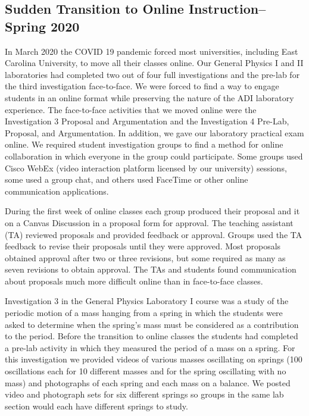 \documentclass[aip, numerical, preprint]{revtex4-2}
\begin{document}
\subsection{Sudden Transition to Online Instruction--Spring 2020}

In March 2020 the COVID 19 pandemic forced most universities, including East Carolina University, to move all their classes online. Our General Physics I and II laboratories had completed two out of four full investigations and the pre-lab for the third investigation face-to-face. We were forced to find a way to engage students in an online format while preserving the nature of the ADI laboratory experience. The face-to-face activities that we moved online were the Investigation 3 Proposal and Argumentation and the Investigation 4 Pre-Lab, Proposal, and Argumentation. In addition, we gave our laboratory practical exam online. We required student investigation groups to find a method for online collaboration in which everyone in the group could participate. Some groups used Cisco WebEx (video interaction platform licensed by our university) sessions, some used a group chat, and others used FaceTime or other online communication applications. 

During the first week of online classes each group produced their proposal and it on a Canvas Discussion in a proposal form for approval. The teaching assistant (TA) reviewed proposals and provided feedback or approval. Groups used the TA feedback to revise their proposals until they were approved. Most proposals obtained approval after two or three revisions, but some required as many as seven revisions to obtain approval. The TAs and students found communication about proposals much more difficult online than in face-to-face classes. 

Investigation 3 in the General Physics Laboratory I course was a study of the periodic motion of a mass hanging from a spring in which the students were asked to determine when the spring's mass must be considered as a contribution to the period. Before the transition to online classes the students had completed a pre-lab activity in which they measured the period of a mass on a spring. For this investigation we provided videos of various masses oscillating on springs (100 oscillations each for 10 different masses and for the spring oscillating with no mass) and photographs of each spring and each mass on a balance. We posted video and photograph sets for six different springs so groups in the same lab section would each have different springs to study. 
\end{document}

